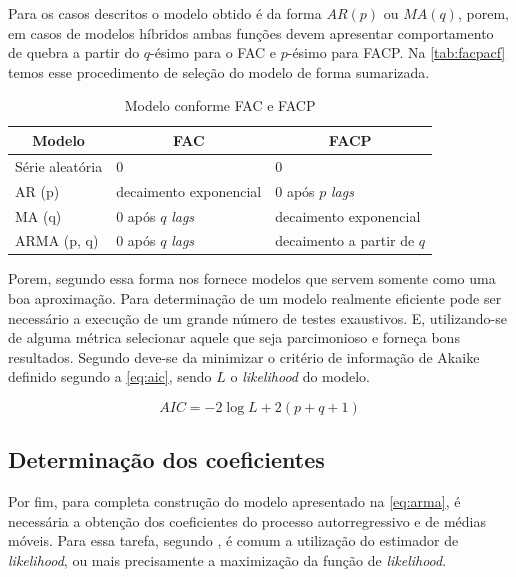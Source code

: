 \documentclass[
    12pt,
    oneside,
    a4paper,
    english,
    brazil
]{abntex2}
\begin{document}
Para os casos descritos  o modelo obtido é da forma  $AR(p)$ ou $MA(q)$, porem,
em casos  de modelos híbridos  ambas funções devem apresentar  comportamento de
quebra  a  partir  do  $q$-ésimo  para  o  FAC  e  $p$-ésimo  para  FACP\@.  Na
\autoref{tab:facpacf} temos  esse procedimento  de seleção  do modelo  de forma
sumarizada.

\begin{table}[ht]
    \centering
    \caption{Modelo conforme FAC e FACP}\label{tab:facpacf}
    \begin{tabular}{l l l}
        \multicolumn{1}{c}{Modelo} & \multicolumn{1}{c}{FAC} & \multicolumn{1}{c}{FACP} \\
        \toprule
        Série aleatória  & 0                           & 0                        \\
        AR (p)           & decaimento exponencial      & 0 após $p$ \textit{lags} \\
        MA (q)           & 0 após $q$ \textit{lags}    & decaimento exponencial   \\
        ARMA (p, q)      & 0 após $q$ \textit{lags}    & decaimento a partir de $q$
    \end{tabular}
\end{table}

Porem, segundo   essa  forma nos  fornece modelos  que servem
somente  como uma  boa aproximação.  Para determinação  de um  modelo realmente
eficiente  pode  ser necessário  a  execução  de  um  grande número  de  testes
exaustivos.  E, utilizando-se  de  alguma métrica  selecionar  aquele que  seja
parcimonioso  e  forneça  bons  resultados.  Segundo    deve-se
da  minimizar   o  critério  de   informação  de  Akaike  definido   segundo  a
\autoref{eq:aic}, sendo $L$ o \textit{likelihood} do modelo.

\begin{equation}
    \label{eq:aic}
    AIC = -2\log{L}+2(p+q+1)
\end{equation}

\subsection{Determinação dos coeficientes}

Por fim, para completa construção do modelo apresentado na \autoref{eq:arma}, é
necessária a obtenção dos coeficientes  do processo autorregressivo e de médias
móveis. Para essa  tarefa, segundo , é comum  a utilização do
estimador de \textit{likelihood}, ou mais  precisamente a maximização da função
de \textit{likelihood}.
\end{document}
